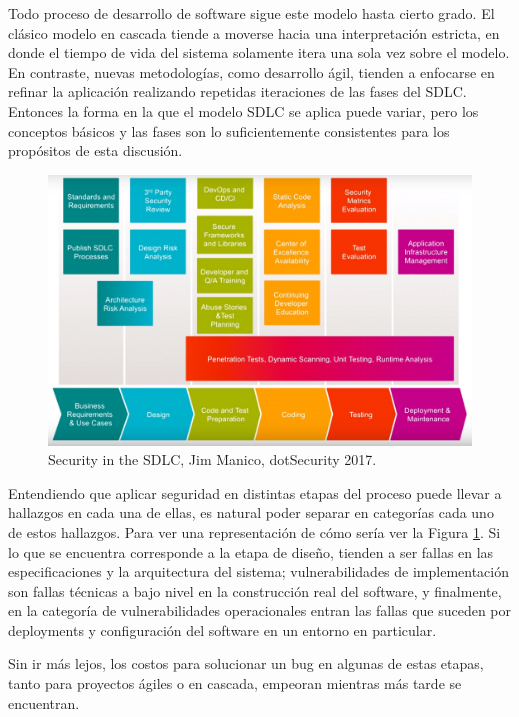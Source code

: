 Todo proceso de desarrollo de software sigue este modelo hasta cierto grado. El clásico modelo en cascada tiende a moverse hacia una interpretación estricta, en donde el tiempo de vida del sistema solamente itera una sola vez sobre el modelo. En contraste, nuevas metodologías, como desarrollo ágil\cite{ries2012metodo}, tienden a enfocarse en refinar la aplicación realizando repetidas iteraciones de las fases del SDLC. Entonces la forma en la que el modelo SDLC se aplica puede variar, pero los conceptos básicos y las fases son lo suficientemente consistentes para los propósitos de esta discusión.

\begin{figure}[h]
    \centering
    \includegraphics[scale=0.19]{images/JimManicodeSSDLC.png}
    \caption{Security in the SDLC, Jim Manico, dotSecurity 2017.}
    \label{fig:ssdlc}
\end{figure}

Entendiendo que aplicar seguridad en distintas etapas del proceso puede llevar a hallazgos en cada una de ellas, es natural poder separar en categorías cada uno de estos hallazgos. Para ver una representación de cómo sería ver la Figura \ref{fig:ssdlc}.
Si lo que se encuentra corresponde a la etapa de diseño, tienden a ser fallas en las especificaciones y la arquitectura del sistema; vulnerabilidades de implementación son fallas técnicas a bajo nivel en la construcción real del software, y finalmente, en la categoría de vulnerabilidades operacionales  entran las fallas que suceden por deployments y configuración del software en un entorno en particular.

Sin ir más lejos, los costos para solucionar un bug en algunas de estas etapas, tanto para proyectos ágiles o en cascada, empeoran mientras más tarde se encuentran.

